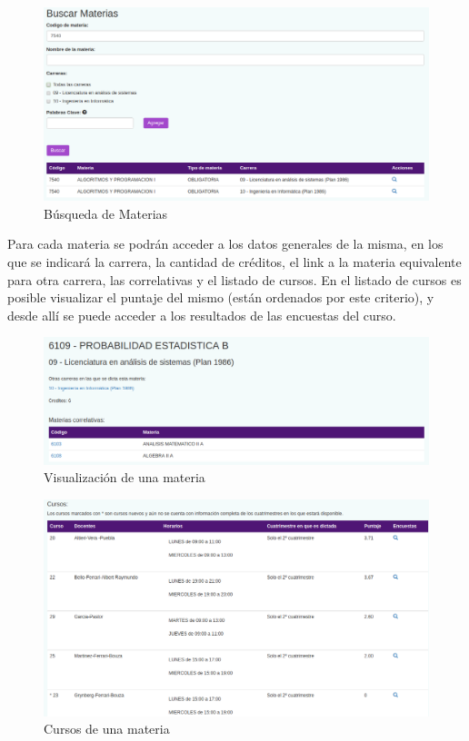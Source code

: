 \documentclass[a4paper]{article}
\begin{document}
\begin{figure}[H]
\centering
\includegraphics[scale=0.35]{Imagenes/buscar_materias.png}\par
\caption{Búsqueda de Materias}
\end{figure}

Para cada materia se podrán acceder a los datos generales de la misma, en los que se indicará la carrera, la cantidad de créditos, el link a la materia equivalente para otra carrera, las correlativas y el listado de cursos.
En el listado de cursos es posible visualizar el puntaje del mismo (están ordenados por este criterio), y desde allí se puede acceder a los resultados de las encuestas del curso.

\begin{figure}[H]
\centering
\includegraphics[scale=0.35]{Imagenes/ver_materia_datos_generales.png}\par
\caption{Visualización de una materia}
\end{figure}

\begin{figure}[H]
\centering
\includegraphics[scale=0.35]{Imagenes/ver_materia_cursos.png}\par
\caption{Cursos de una materia}
\end{figure}
\end{document}
